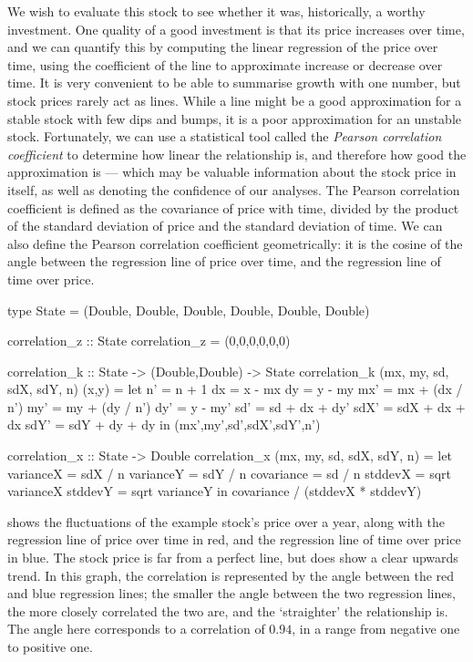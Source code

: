 We wish to evaluate this stock to see whether it was, historically, a worthy investment.
One quality of a good investment is that its price increases over time, and we can quantify this by computing the linear regression of the price over time, using the coefficient of the line to approximate increase or decrease over time.
It is very convenient to be able to summarise growth with one number, but stock prices rarely act as lines.
While a line might be a good approximation for a stable stock with few dips and bumps, it is a poor approximation for an unstable stock.
Fortunately, we can use a statistical tool called the \emph{Pearson correlation coefficient} to determine how linear the relationship is, and therefore how good the approximation is --- which may be valuable information about the stock price in itself, as well as denoting the confidence of our analyses.
The Pearson correlation coefficient is defined as the covariance of price with time, divided by the product of the standard deviation of price and the standard deviation of time.
We can also define the Pearson correlation coefficient geometrically: it is the cosine of the angle between the regression line of price over time, and the regression line of time over price.


\begin{haskell}[float,label=figs/impl/correlation,caption=One-pass correlation implementation]
type State = (Double, Double, Double, Double, Double, Double)

correlation_z :: State
correlation_z = (0,0,0,0,0,0)

correlation_k :: State -> (Double,Double) -> State
correlation_k (mx, my, sd, sdX, sdY, n) (x,y) =
 let n'   = n   + 1
     dx   = x   - mx
     dy   = y   - my
     mx'  = mx  + (dx / n')
     my'  = my  + (dy / n')
     dy'  = y   - my'
     sd'  = sd  + dx + dy'
     sdX' = sdX + dx + dx
     sdY' = sdY + dy + dy
 in (mx',my',sd',sdX',sdY',n')

correlation_x :: State -> Double
correlation_x (mx, my, sd, sdX, sdY, n) =
  let varianceX  = sdX / n
      varianceY  = sdY / n
      covariance = sd  / n
      stddevX = sqrt varianceX
      stddevY = sqrt varianceY
  in covariance / (stddevX * stddevY)
\end{haskell}


 shows the fluctuations of the example stock's price over a year, along with the regression line of price over time in red, and the regression line of time over price in blue.
The stock price is far from a perfect line, but does show a clear upwards trend.
In this graph, the correlation is represented by the angle between the red and blue regression lines; the smaller the angle between the two regression lines, the more closely correlated the two are, and the `straighter' the relationship is.
The angle here corresponds to a correlation of $0.94$, in a range from negative one to positive one.

